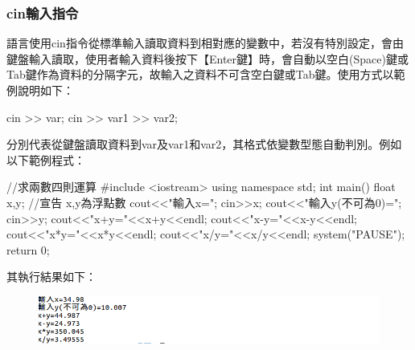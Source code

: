 \subsubsection{cin輸入指令}
\cc{}語言使用cin指令從標準輸入讀取資料到相對應的變數中，若沒有特別設定，會由鍵盤輸入讀取，使用者輸入資料後按下【Enter鍵】時，會自動以空白(Space)鍵或Tab鍵作為資料的分隔字元，故輸入之資料不可含空白鍵或Tab鍵。使用方式以範例說明如下：
\begin{inside}
	cin >> var;
	cin >> var1 >> var2;
\end{inside}
分別代表從鍵盤讀取資料到var及var1和var2，其格式依變數型態自動判別。例如以下範例程式：
\begin{cppcode}
//求兩數四則運算
#include <iostream>
using namespace std;
int main()
{
	float x,y;  //宣告 x,y為浮點數
	cout<<"輸入x=";
	cin>>x;
	cout<<"輸入y(不可為0)=";
	cin>>y;
	cout<<"x+y="<<x+y<<endl;
	cout<<"x-y="<<x-y<<endl;
	cout<<"x*y="<<x*y<<endl;
	cout<<"x/y="<<x/y<<endl;	
	system("PAUSE");
	return 0;				
}
\end{cppcode}
其執行結果如下：
\begin{figure}[H]
	\centering
	\includegraphics[width=18cm]{fig/cpp_io/HW006}
\end{figure}

